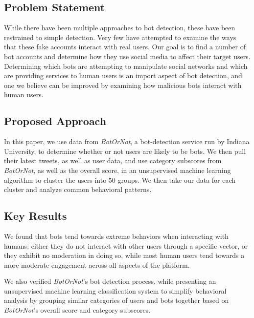\documentclass{sig-alternate-05-2015}
\begin{document}
\subsection{Problem Statement}
While there have been multiple approaches to bot detection\cite{Stringhini:DetectSpam, Xiao:ClusterFakeAccounts, Chu:DetectAutomation}, these have been restrained to simple detection. Very few have attempted to examine the ways that these fake accounts interact with real users. Our goal is to find a number of bot accounts and determine how they use social media to affect their target users. Determining which bots are attempting to manipulate social networks and which are providing services to human users is an import aspect of bot detection, and one we believe can be improved by examining how malicious bots interact with human users.

\subsection{Proposed Approach}
In this paper, we use data from \emph{BotOrNot}, a bot-detection service run by Indiana University, to determine whether or not users are likely to be bots. We then pull their latest tweets, as well as user data, and use category subscores from \emph{BotOrNot}, as well as the overall score, in an unsupervised machine learning algorithm to cluster the users into 50 groups. We then take our data for each cluster and analyze common behavioral patterns.

\subsection{Key Results}
We found that bots tend towards extreme behaviors when interacting with humans: either they do not interact with other users through a specific vector, or they exhibit no moderation in doing so, while most human users tend towards a more moderate engagement across all aspects of the platform.

We also verified \emph{BotOrNot}'s bot detection process, while presenting an unsupervised machine learning classification system to simplify behavioral analysis by grouping similar categories of users and bots together based on \emph{BotOrNot}'s overall score and category subscores.
\end{document}
